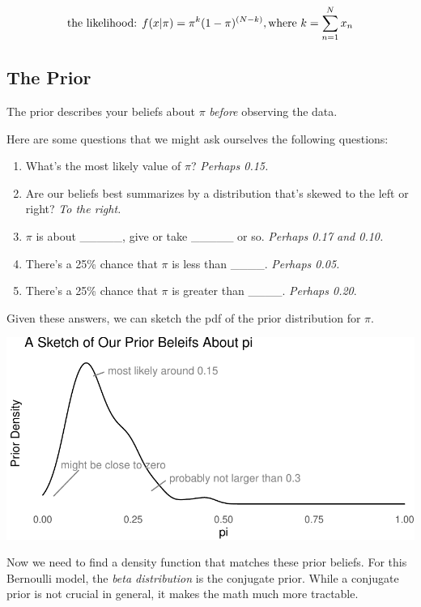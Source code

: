 \documentclass[
]{book}
\providecommand{\tightlist}{%
  \setlength{\itemsep}{0pt}\setlength{\parskip}{0pt}}
\begin{document}
\[
\text{the likelihood:  } f(x | \pi) = \pi^{k} (1 - \pi)^{(N - k)}, \text{where } k = \sum_{n = 1}^N x_n \\
\]

\hypertarget{the-prior}{%
\subsection{The Prior}\label{the-prior}}

The prior describes your beliefs about \(\pi\) \emph{before} observing the data.

Here are some questions that we might ask ourselves the following questions:

\begin{enumerate}
\def\labelenumi{\arabic{enumi}.}
\tightlist
\item
  What's the most likely value of \(\pi\)? \emph{Perhaps 0.15.}
\item
  Are our beliefs best summarizes by a distribution that's skewed to the left or right? \emph{To the right.}
\item
  \(\pi\) is about \_\_\_\_\_, give or take \_\_\_\_\_ or so. \emph{Perhaps 0.17 and 0.10.}
\item
  There's a 25\% chance that \(\pi\) is less than \_\_\_\_. \emph{Perhaps 0.05.}
\item
  There's a 25\% chance that \(\pi\) is greater than \_\_\_\_. \emph{Perhaps 0.20}.
\end{enumerate}

Given these answers, we can sketch the pdf of the prior distribution for \(\pi\).

\includegraphics{02-01-bayes_files/figure-latex/unnamed-chunk-2-1.pdf}

Now we need to find a density function that matches these prior beliefs. For this Bernoulli model, the \emph{beta distribution} is the conjugate prior. While a conjugate prior is not crucial in general, it makes the math much more tractable.
\end{document}
